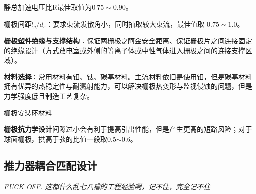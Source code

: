   静总加速电压比R最佳取值为$0.75 \sim 0.90 $。

  栅极间距$l_g / d_s$：要求束流发散角小，同时抽取较大束流，最佳值取 $0.75 \sim 1.0$。

  \textbf{栅极塑件绝缘与支撑结构}：保证两栅极之阿金安全距离、保证栅极片之间连接固定的绝缘设计（方式放电室或外侧的等离子体或中性气体进入栅极之间的连接支撑区域）。

  \textbf{材料选择}：常用材料有钼、钛、碳基材料。主流材料依旧是使用钼，但是碳基材料拥有优异的热稳定性与耐溅射能力，可以解决栅极热变形与监视侵蚀的问题，但是力学强度低且制造工艺复杂。

  栅极安装环材料

  \textbf{栅极抗力学设计}间隙过小会有利于提高引出性能，但是产生更高的短路风险；对于球面栅极，拱高于弦的比值一般取0.5$\sim$0.6。

  \subsection{推力器耦合匹配设计}

  \textit{FUCK OFF. 这都什么乱七八糟的工程经验啊，记不住，完全记不住}

